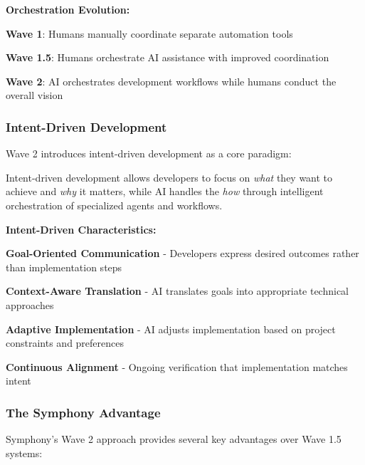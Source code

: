 \textbf{Orchestration Evolution:}

\begin{expandedlist}
    \item \textbf{Wave 1}: Humans manually coordinate separate automation tools
    
    \item \textbf{Wave 1.5}: Humans orchestrate AI assistance with improved coordination
    
    \item \textbf{Wave 2}: AI orchestrates development workflows while humans conduct the overall vision
\end{expandedlist}

\subsubsection{Intent-Driven Development}

Wave 2 introduces intent-driven development as a core paradigm:

\begin{successbox}
Intent-driven development allows developers to focus on \textit{what} they want to achieve and \textit{why} it matters, while AI handles the \textit{how} through intelligent orchestration of specialized agents and workflows.
\end{successbox}

\textbf{Intent-Driven Characteristics:}

\begin{compactlist}
    \item \textbf{Goal-Oriented Communication} - Developers express desired outcomes rather than implementation steps
    \item \textbf{Context-Aware Translation} - AI translates goals into appropriate technical approaches
    \item \textbf{Adaptive Implementation} - AI adjusts implementation based on project constraints and preferences
    \item \textbf{Continuous Alignment} - Ongoing verification that implementation matches intent
\end{compactlist}

\subsubsection{The Symphony Advantage}

Symphony's Wave 2 approach provides several key advantages over Wave 1.5 systems:

